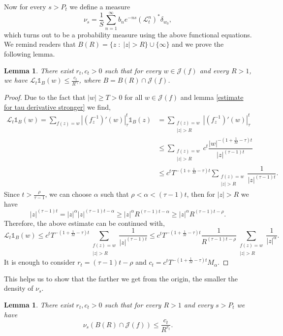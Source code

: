 \documentclass[12pt,reqno]{amsart}
\newtheorem{lemma}[theorem]{Lemma}
\begin{document}
\noindent Now for every $s>P_t$ we define a measure 
$$\nu_s=\dfrac{1}{S}\sum_{n=1}^{\infty}b_ne^{-ns}\left(\mathcal{L}_t^n \right)^*\delta_{w_0},$$
which turns out to be a probability measure using the above functional equations. We remind readers that $B(R)=\{z \; : \; |z|>R\}\cup \{\infty \}$ and we prove the following lemma.
\begin{lemma}\label{shriking transfer operator outside diks}
    There exist $r_t, c_t >0$ such that for every $w\in \mathcal{J}(f)$ and every $R>1$, we have $\mathcal{L}_t \mathbb{1}_{B}(w)\leq \frac{c_t}{R^{r_t}}$, where $B=B(R) \cap \mathcal{J}(f)$.
\end{lemma}
\begin{proof}
Due to the fact that $|w|\geq T>0$ for all $w \in \mathcal{J}(f)$ and lemma \ref{estimate for tau derivative stronger} we find,
    \begin{align*}
        \mathcal{L}_t \mathbb{1}_{B}(w) =\sum_{f(z)=w} \left|(f_z^{-1})'(w)\right|_{\tau}^t\mathbb{1}_{B}(z)
        &=\sum_{\substack{f(z)=w \\ |z|>R}} \left|(f_z^{-1})'(w)\right|_{\tau}^t \\
        & \leq \sum_{\substack{f(z)=w \\ |z|>R}} c^{t}\dfrac{|w|^{-(1+\frac{1}{M}-\tau)t}}{|z|^{(\tau-1)t}} \\
        & \leq c^t T^{-(1+\frac{1}{M}-\tau)t} \sum_{\substack{f(z)=w \\ |z|>R}} \dfrac{1}{|z|^{(\tau-1)t}}.
    \end{align*}
    Since $t>\frac{\rho}{\tau-1}$, we can choose $\alpha$ such that $\rho<\alpha<(\tau-1)t$, then for $|z| > R$ we have 
    $$|z|^{(\tau-1)t}=|z|^{\alpha}|z|^{(\tau-1)t-\alpha}\geq |z|^{\alpha}R^{(\tau-1)t-\alpha}\geq |z|^{\alpha}R^{(\tau-1)t-\rho}.$$
    Therefore, the above estimate can be continued with,
    $$\mathcal{L}_t \mathbb{1}_{B}(w) \leq c^t T^{-(1+\frac{1}{M}-\tau)t} \sum_{\substack{f(z)=w \\ |z|>R}} \dfrac{1}{|z|^{(\tau-1)t}} \leq c^t T^{-(1+\frac{1}{M}-\tau)t} \dfrac{1}{R^{(\tau-1)t-\rho}}\sum_{\substack{f(z)=w \\ |z|>R}} \dfrac{1}{|z|^{\alpha}}.$$
    It is enough to consider $r_t=(\tau-1)t-\rho$ and $c_t=c^t T^{-(1+\frac{1}{M}-\tau)t}M_{\alpha}$.
\end{proof}
\noindent This helps us to show that the farther we get from the origin, the smaller the density of $\nu_s$. 
\begin{lemma}\label{tighetness}
    There exist $r_t, c_t >0$ such that for every $R>1$ and every $s>P_t$ we have 
    $$\nu_s \left( B(R)\cap \mathcal{J}(f) \right) \leq \frac{c_t}{R^{r_t}}.$$
\end{lemma}
\end{document}

